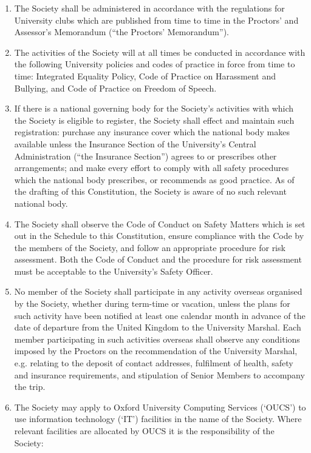 \documentclass[11pt]{article}
\begin{document}
\begin{enumerate}
\item The Society shall be administered in accordance with the regulations for University clubs which are published from time to time in the Proctors' and Assessor's Memorandum (``the Proctors' Memorandum'').
\item The activities of the Society will at all times be conducted in accordance with the following University policies and codes of practice in force from time to time: Integrated Equality Policy, Code of Practice on Harassment and Bullying, and Code of Practice on Freedom of Speech.
\item \label{com:ins} If there is a national governing body for the Society's activities with which the Society is eligible to register, the Society shall effect and maintain such registration: purchase any insurance cover which the national body makes available unless the Insurance Section of the University's Central Administration (``the Insurance Section'') agrees to or prescribes other arrangements; and make every effort to comply with all safety procedures which the national body prescribes, or recommends as good practice.
\subitem As of the drafting of this Constitution, the Society is aware of no such relevant national body.
\item The Society shall observe the Code of Conduct on Safety Matters which is set out in the Schedule to this Constitution, ensure compliance with the Code by the members of the Society, and follow an appropriate procedure for risk assessment. Both the Code of Conduct and the procedure for risk assessment must be acceptable to the University's Safety Officer.
\item No member of the Society shall participate in any activity overseas organised by the Society, whether during term-time or vacation, unless the plans for such activity have been notified at least one calendar month in advance of the date of departure from the United Kingdom to the University Marshal. Each member participating in such activities overseas shall observe any conditions imposed by the Proctors on the recommendation of the University Marshal, e.g. relating to the deposit of contact addresses, fulfilment of health, safety and insurance requirements, and stipulation of Senior Members to accompany the trip.
\item The Society may apply to Oxford University Computing Services (`OUCS') to use information technology (`IT') facilities in the name of the Society. Where relevant facilities are allocated by OUCS it is the responsibility of the Society:

\end{enumerate}
\end{document}

